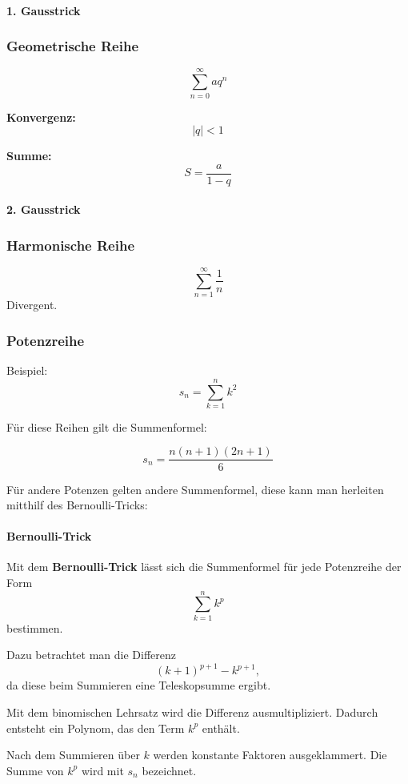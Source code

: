 \documentclass[../zusammenfassung_AN.tex]{subfiles}
\begin{document}
	\paragraph{1. Gausstrick}
	
	\subsubsection{Geometrische Reihe}
	\[
	\sum_{n=0}^{\infty} a q^n
	\]
	
	\textbf{Konvergenz:}
	\[
	|q| < 1
	\]
	
	\textbf{Summe:}
	\[
	S = \frac{a}{1-q}
	\]
	
	\paragraph{2. Gausstrick}
	
	\subsubsection{Harmonische Reihe}
	\[
	\sum_{n=1}^{\infty} \frac{1}{n}
	\]
	Divergent.
	
	\subsubsection{Potenzreihe}
	Beispiel:
	$$s_n=\sum_{k=1}^{n}k^2$$
	
	Für diese Reihen gilt die Summenformel:
	
	$$s_n=\frac{n(n+1)(2n+1)}{6}$$
	
	Für andere Potenzen gelten andere Summenformel, diese kann man herleiten mitthilf des Bernoulli-Tricks:
	
	\paragraph{Bernoulli-Trick}
	
	Mit dem \textbf{Bernoulli-Trick} lässt sich die Summenformel für jede Potenzreihe der Form
	\[
	\sum_{k=1}^n k^p
	\]
	bestimmen.
	
	Dazu betrachtet man die Differenz
	\[
	(k+1)^{p+1} - k^{p+1},
	\]
	da diese beim Summieren eine Teleskopsumme ergibt.
	
	Mit dem binomischen Lehrsatz wird die Differenz ausmultipliziert. Dadurch entsteht ein Polynom, das den Term \(k^p\) enthält.
	
	Nach dem Summieren über \(k\) werden konstante Faktoren ausgeklammert. Die Summe von \(k^p\) wird mit \(s_n\) bezeichnet.
	
\end{document}
